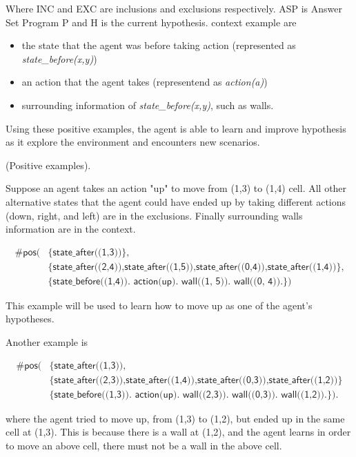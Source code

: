 Where INC and EXC are inclusions and exclusions respectively. ASP is Answer Set Program P and H is the current hypothesis. 
context example are
\begin{itemize}
    \item the state that the agent was before taking action (represented as \textit{state\_before(x,y)})
    \item an action that the agent takes (representend as \textit{action(a)})
    \item surrounding information of \textit{state\_before(x,y)}, such as walls. 
\end{itemize}


Using these positive examples, the agent is able to learn and improve hypothesis as it explore the environment and encounters new scenarios. 

\begin{examp} \normalfont (Positive examples). 

Suppose an agent takes an action "up" to move from (1,3) to (1,4) cell. All other alternative states that the agent could have ended up by taking different actions 
(down, right, and left) are in the exclusions. Finally surrounding walls information are in the context.

\begin{equation*}
\begin{split}
    \textsf{\#pos(} & \textsf{\{state\_after((1,3))\},}\\
                    & \textsf{\{state\_after((2,4)),state\_after((1,5)),state\_after((0,4)),state\_after((1,4))\},} \\
    & \textsf{\{state\_before((1,4)). action(up). wall((1, 5)). wall((0, 4)).\})}
\end{split}
\end{equation*}

This example will be used to learn how to move up as one of the agent's hypotheses.

Another example is 

\begin{equation*}
\begin{split}
\textsf{\#pos(} & \textsf{\{state\_after((1,3))}, \\ 
                & \textsf{\{state\_after((2,3)),state\_after((1,4)),state\_after((0,3)),state\_after((1,2))\}} \\       
                & \textsf{\{state\_before((1,3)). action(up). wall((2,3)). wall((0,3)). wall((1,2)).\}).}
\end{split}
\end{equation*}


where the agent tried to move up, from (1,3) to (1,2), but ended up in the same cell at (1,3). This is because there is a wall at (1,2), and the agent learns in order to move an above cell,
there must not be a wall in the above cell. 

\end{examp}
\label{state_transition_example}

